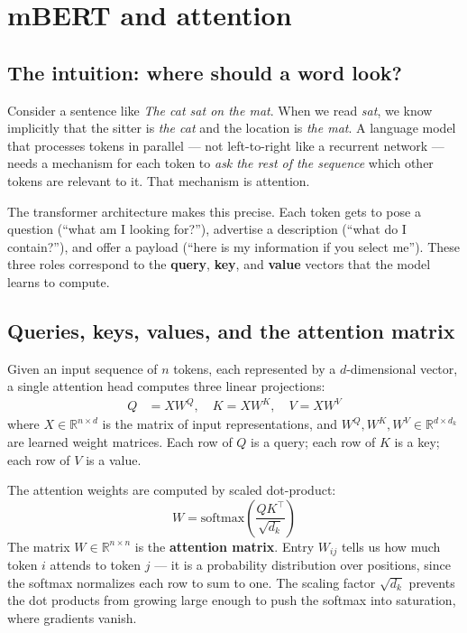 \chapter{mBERT and attention}
\label{ch:attention}

\section{The intuition: where should a word look?}

Consider a sentence like \emph{The cat sat on the mat}. When we read \emph{sat}, we know implicitly that the sitter is \emph{the cat} and the location is \emph{the mat}. A language model that processes tokens in parallel --- not left-to-right like a recurrent network --- needs a mechanism for each token to \emph{ask the rest of the sequence} which other tokens are relevant to it. That mechanism is attention.

The transformer architecture \parencite{vaswani2017} makes this precise. Each token gets to pose a question (``what am I looking for?''), advertise a description (``what do I contain?''), and offer a payload (``here is my information if you select me''). These three roles correspond to the \textbf{query}, \textbf{key}, and \textbf{value} vectors that the model learns to compute.

\section{Queries, keys, values, and the attention matrix}

Given an input sequence of $n$ tokens, each represented by a $d$-dimensional vector, a single attention head computes three linear projections:
\begin{align}
  Q &= X W^Q, \quad K = X W^K, \quad V = X W^V \label{eq:qkv}
\end{align}
where $X \in \mathbb{R}^{n \times d}$ is the matrix of input representations, and $W^Q, W^K, W^V \in \mathbb{R}^{d \times d_k}$ are learned weight matrices. Each row of $Q$ is a query; each row of $K$ is a key; each row of $V$ is a value.

The attention weights are computed by scaled dot-product:
\begin{equation}
  W = \mathrm{softmax}\!\left(\frac{Q K^\top}{\sqrt{d_k}}\right) \label{eq:attention}
\end{equation}
The matrix $W \in \mathbb{R}^{n \times n}$ is the \textbf{attention matrix}. Entry $W_{ij}$ tells us how much token $i$ attends to token $j$ --- it is a probability distribution over positions, since the softmax normalizes each row to sum to one. The scaling factor $\sqrt{d_k}$ prevents the dot products from growing large enough to push the softmax into saturation, where gradients vanish.

